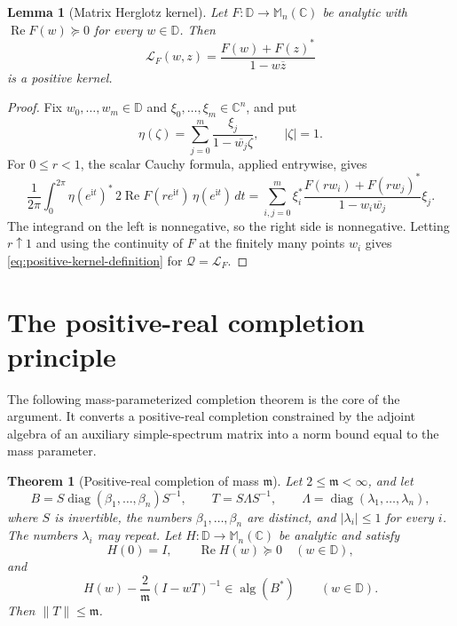 \documentclass[preprints,article,submit,oneauthor]{Definitions/mdpi}
\newcounter{manuscriptresult}[section]
\theoremstyle{mdpi}
\newtheorem{theorem}[manuscriptresult]{Theorem}
\newtheorem{lemma}[manuscriptresult]{Lemma}
\theoremstyle{definition}
\newcommand{\C}{\mathbb C}
\newcommand{\D}{\mathbb D}
\newcommand{\Mn}{\mathbb M_n(\C)}
\newcommand{\alg}{\operatorname{alg}}
\newcommand{\RePart}{\operatorname{Re}}
\newcommand{\diag}{\operatorname{diag}}
\newcommand{\iu}{\mathrm{i}}
\begin{document}
\begin{lemma}[Matrix Herglotz kernel]
\label{lem:herglotz-kernel}
Let $F\colon\D\to\Mn$ be analytic with
$\RePart F(w)\succeq0$ for every $w\in\D$.  Then
\begin{equation}
  \mathcal L_F(w,z)
  =\frac{F(w)+F(z)^*}{1-w\overline z}
  \label{eq:herglotz-kernel}
\end{equation}
is a positive kernel.
\end{lemma}

\begin{proof}
Fix $w_0,\ldots,w_m\in\D$ and
$\xi_0,\ldots,\xi_m\in\C^n$, and put
\[
  \eta(\zeta)=\sum_{j=0}^m
  \frac{\xi_j}{1-\overline{w_j}\zeta},
  \qquad \lvert\zeta\rvert=1.
\]
For $0\leq r<1$, the scalar Cauchy formula, applied entrywise, gives
\begin{equation}
  \frac{1}{2\pi}
  \int_0^{2\pi}
  \eta(e^{\iu t})^*\,2\RePart
  F(re^{\iu t})\,
  \eta(e^{\iu t})\,dt
  =
  \sum_{i,j=0}^m \xi_i^*
  \frac{F(rw_i)+F(rw_j)^*}
       {1-w_i\overline{w_j}}\xi_j.
  \label{eq:regularized-herglotz-average}
\end{equation}
The integrand on the left is nonnegative, so the right side is
nonnegative.  Letting $r\uparrow1$ and using the continuity of $F$ at
the finitely many points $w_i$ gives
\eqref{eq:positive-kernel-definition} for
$\mathcal Q=\mathcal L_F$.
\end{proof}

\section{The positive-real completion principle}
\label{sec:completion}

The following mass-parameterized completion theorem is the core of the
argument.  It converts a positive-real completion constrained by the
adjoint algebra of an auxiliary simple-spectrum matrix into a norm
bound equal to the mass parameter.

\begin{theorem}[Positive-real completion of mass $\mathfrak m$]
\label{thm:completion}
Let $2\leq\mathfrak m<\infty$, and let
\begin{equation}
  B=S\diag(\beta_1,\ldots,\beta_n)S^{-1},
  \qquad
  T=S\Lambda S^{-1},
  \qquad
  \Lambda=\diag(\lambda_1,\ldots,\lambda_n),
  \label{eq:T-diagonalization}
\end{equation}
where $S$ is invertible, the numbers $\beta_1,\ldots,\beta_n$ are
distinct, and $\lvert\lambda_i\rvert\leq1$ for every $i$.  The numbers
$\lambda_i$ may repeat.
Let $H\colon\D\to\Mn$ be analytic and satisfy
\begin{equation}
  H(0)=I,\qquad \RePart H(w)\succeq0\quad(w\in\D),
  \label{eq:completion-positive-real}
\end{equation}
and
\begin{equation}
  H(w)-\frac{2}{\mathfrak m}(I-wT)^{-1}
  \in\alg(B^*)\qquad(w\in\D).
  \label{eq:completion-algebra-condition}
\end{equation}
Then $\lVert T\rVert\leq\mathfrak m$.
\end{theorem}
\end{document}
